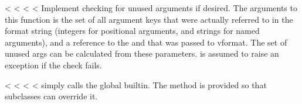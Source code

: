 \documentclass[letterpaper,10pt,english]{sphinxmanual}
\begin{document}
\begin{fulllineitems}
\begin{fulllineitems}
\label{\detokenize{string:string.Formatter.check_unused_args}}
<%
\pysigstartsignatures
<%
<%
<%
Implement checking for unused arguments if desired.  The arguments to this
function is the set of all argument keys that were actually referred to in
the format string (integers for positional arguments, and strings for
named arguments), and a reference to the  and  that was
passed to vformat.  The set of unused args can be calculated from these
parameters.  {\hyperref[\detokenize{string:string.Formatter.check_unused_args}]{}} is assumed to raise an exception if
the check fails.

\end{fulllineitems}


\vspace{5px}

\begin{fulllineitems}
\label{\detokenize{string:string.Formatter.format_field}}
<%
\pysigstartsignatures
<%
<%
<%
{\hyperref[\detokenize{string:string.Formatter.format_field}]{}} simply calls the global {\hyperref[\detokenize{string:string.Formatter.format}]{}} built\sphinxhyphen{}in.  The
method is provided so that subclasses can override it.

\end{fulllineitems}



\end{fulllineitems}
\end{document}
